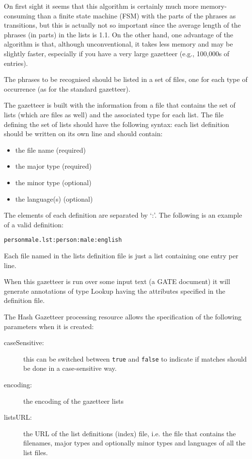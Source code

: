 On first sight it seems that this algorithm is certainly much more
memory-consuming than a finite state machine (FSM) with the parts of the phrases
as transitions, but this is actually not so important since the average length
of the phrases (in parts) in the lists is 1.1.  On the other hand, one advantage
of the algorithm is that, although unconventional, it takes less memory and may
be slightly faster, especially if you have a very large gazetteer (e.g.,
100,000s of entries).


The phrases to be recognised should be listed in a set of files, one for
each type of occurrence (as for the standard gazetteer).

The gazetteer is built with the information from a file that contains the set
of lists (which are files as well) and the associated type for each list.
The file defining the set of lists should have the following syntax: each
list definition should be written on its own line and should contain:
\begin{itemize}
\item the file name (required)
\item the major type (required)
\item the minor type (optional)
\item the language(s) (optional)
\end{itemize}

The elements of each definition are separated by `:'. The following is an
example of a valid definition:
\begin{small}
\begin{verbatim}
personmale.lst:person:male:english
\end{verbatim}
\end{small}
Each file named in the lists definition file is just a list containing
one entry per line.

When this gazetteer is run over some input text (a GATE document) it
will generate annotations of type Lookup having the attributes specified in
the definition file.


The Hash Gazetteer processing resource allows the specification of the
following parameters when it is created:
\begin{description}
\item[caseSensitive:] this can be switched between \texttt{true} and 
\texttt{false} to indicate if matches should be done in a case-sensitive 
way.
\item[encoding:] the encoding of the gazetteer lists
\item[listsURL:] the URL of the list definitions (index) file, i.e. the
file that contains the filenames, major types and optionally minor types
and languages of all the list files.
\end{description}

